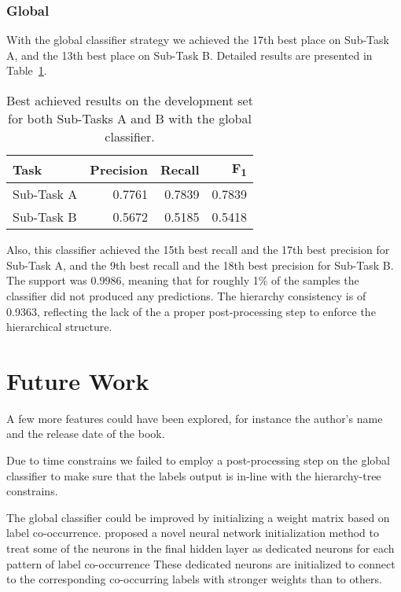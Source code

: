 \documentclass[11pt,a4paper]{article}
\begin{document}
\subsubsection{Global}

With the global classifier strategy we achieved the 17th best place on Sub-Task A,
and the 13th best place on Sub-Task B. Detailed results are presented in
Table~\ref{global_devset-results}.

\begin{table}[!h]
\begin{center}
\begin{tabular}{|l|r|r|r|}
\hline\centering\textbf{Task}  & \textbf{Precision} &  \textbf{Recall} &  \textbf{F\textsubscript{1}}\\
\hline
 Sub-Task A   &  0.7761 & 0.7839 & 0.7839 \\
 Sub-Task B   &  0.5672 & 0.5185 & 0.5418 \\
\hline
\end{tabular}
\end{center}
\caption{\label{global_devset-results} Best achieved results on the development
          set for both Sub-Tasks A and B with the global classifier.}
\end{table}

Also, this classifier achieved the 15th best recall and the 17th best precision
for Sub-Task A, and the 9th best recall and the 18th best precision for Sub-Task B.
The support was 0.9986, meaning that for roughly 1\% of the samples the classifier
did not produced any predictions. The hierarchy consistency is of 0.9363, reflecting
the lack of the a proper post-processing step to enforce the hierarchical structure.


\section{Future Work}\label{future}


A few more features could have been explored, for instance the author's name
and the release date of the book.

Due to time constrains we failed to employ a post-processing step on the global
classifier to make sure that the labels output is in-line with the hierarchy-tree
constrains.

The global classifier could be improved by initializing a weight matrix based on
label co-occurrence. \citet{kurata-etal-2016-improved} proposed a novel neural
network initialization method to treat some of the neurons in the final
hidden layer as dedicated neurons for each pattern of label co-occurrence
These dedicated neurons are initialized to connect to the corresponding
co-occurring labels with stronger weights than to others.



\end{document}
